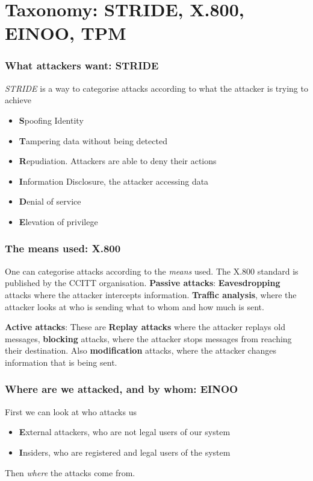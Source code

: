 \section{Taxonomy: STRIDE, X.800, EINOO, TPM}
    \begin{frame}
        \frametitle{What attackers want: STRIDE}
            \textit{STRIDE} is a way to categorise attacks according to what the attacker is trying to achieve
            \begin{itemize}
                \item \textbf{S}poofing Identity
                \item \textbf{T}ampering data without being detected
                \item \textbf{R}epudiation. Attackers are able to deny their actions
                \item \textbf{I}nformation Disclosure, the attacker accessing data
                \item \textbf{D}enial of service
                \item \textbf{E}levation of privilege
            \end{itemize}
    \end{frame}
    \begin{frame}
        \frametitle{The means used: X.800}
            One can categorise attacks according to the \textit{means} used. The X.800 standard is published by the CCITT organisation.
            \textbf{Passive attacks}: \textbf{Eavesdropping} attacks where the attacker intercepts information. \textbf{Traffic analysis}, where the attacker looks at who is sending what to whom and how much is sent.
            
            \textbf{Active attacks}: These are \textbf{Replay attacks} where the attacker replays old messages, \textbf{blocking} attacks, where the attacker stops messages from reaching their destination. Also \textbf{modification} attacks, where the attacker changes information that is being sent. 
    \end{frame}
    \begin{frame}
        \frametitle{Where are we attacked, and by whom: EINOO}
            First we can look at who attacks us
            \begin{itemize}
                \item \textbf{E}xternal attackers, who are not legal users of our system
                \item \textbf{I}nsiders, who are registered and legal users of the system
            \end{itemize}
            Then \textit{where} the attacks come from. 
    \end{frame}
